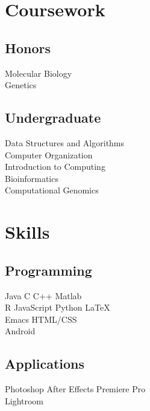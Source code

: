 \documentclass[]{vishrutrao-resume}
\begin{document}
\begin{minipage}[t]{0.33\textwidth}
\sectionsep


\section{Coursework}
\subsection{Honors}
Molecular Biology \\
Genetics \\
\sectionsep

\subsection{Undergraduate}
Data Structures and Algorithms \\
Computer Organization \\
Introduction to Computing \\
Bioinformatics \\
Computational Genomics \\



\section{Skills}
\subsection{Programming}
Java \textbullet{}   C \textbullet{} C++ \textbullet{} Matlab \\
R \textbullet{} JavaScript \textbullet{} Python \textbullet{} \LaTeX\ \\ 
Emacs \textbullet{} HTML/CSS \\

Android 
\sectionsep

\subsection{Applications}
Photoshop \textbullet{} After Effects \textbullet{} Premiere Pro \\
Lightroom 

%
%

\end{minipage} 
\end{document}
